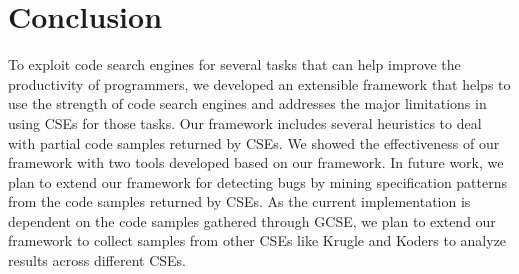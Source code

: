 \section{Conclusion}
\label{sec:conclusion}

To exploit code search engines for several tasks that can help
improve the productivity of programmers, we developed an extensible
framework that helps to use the strength of code search engines and
addresses the major limitations in using CSEs for those tasks. Our
framework includes several heuristics to deal with partial code
samples returned by CSEs. We showed the effectiveness of our
framework with two tools developed based on our framework. In future
work, we plan to extend our framework for detecting bugs by mining
specification patterns from the code samples returned by CSEs. As
the current implementation is dependent on the code samples gathered
through GCSE, we plan to extend our framework to collect samples
from other CSEs like Krugle and Koders to analyze results across
different CSEs.
